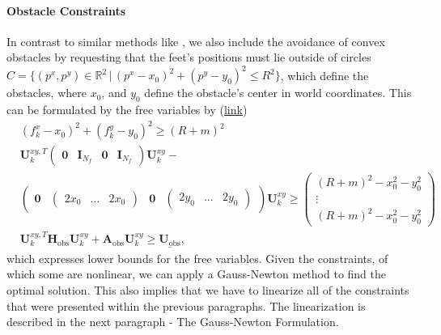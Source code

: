 \paragraph{Obstacle Constraints}
In contrast to similar methods like \cite{herdt2010walking}, we also include the avoidance of convex obstacles by requesting that the feet's positions must lie outside of circles $C = \{(p^x, p^y)\in\mathbb{R}^2 \,|\, (p^x-x_0)^2+(p^y-y_0)^2\leq R^2\}$, which define the obstacles, where $x_0$, and $y_0$ define the obstacle's center in world coordinates. This can be formulated by the free variables by (\href{https://github.com/mhubii/nmpc_pattern_generator/blob/dc1f5a9366cbbbf76f1b02cada642f6ac9a04c89/libs/pattern_generator/src/base_generator.cpp#L1271}{\underline{link}})
\begin{align}
	&(f_k^x-x_0)^2 + (f_k^y-y_0)^2 \geq (R + m)^2
	\label{eq::212_obstacle}\\
	&\bm{U}_k^{xy,T}\begin{pmatrix}
	\bm{0} & \textbf{I}_{N_f} & \bm{0}& \textbf{I}_{N_f}
	\end{pmatrix}\bm{U}_k^{xy} - \\&\begin{pmatrix}
	\bm{0} & \begin{pmatrix}
	2x_0 & \dots & 2x_0
	\end{pmatrix} & \bm{0} & \begin{pmatrix}
	2y_0 & \dots & 2y_0
	\end{pmatrix}
	\end{pmatrix} \bm{U}_k^{xy}\geq \begin{pmatrix}
	(R + m)^2-x_0^2-y_0^2 \\
	\vdots \\
	(R + m)^2-x_0^2-y_0^2
	\end{pmatrix}\\
	&\bm{U}_k^{xy,T}\bm{H}_{\text{obs}}\bm{U}_k^{xy}+\bm{A}_{\text{obs}}\bm{U}_k^{xy} \geq \underline{\bm{U}_{\text{obs}}},
\end{align}
which expresses lower bounds for the free variables. Given the constraints, of which some are nonlinear, we can apply a Gauss-Newton method to find the optimal solution. This also implies that we have to linearize all of the constraints that were presented within the previous paragraphs. The linearization is described in the next paragraph - The Gauss-Newton Formulation.
\FloatBarrier
